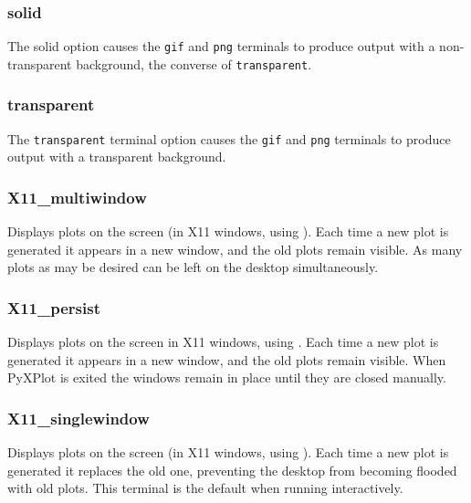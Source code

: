 \subsubsection{solid}

The solid option causes the {\tt gif} and {\tt png} terminals to produce output
with a non-transparent background, the converse of {\tt transparent}.


\subsubsection{transparent}

The {\tt transparent} terminal option causes the {\tt gif} and {\tt png}
terminals to produce output with a transparent background.


\subsubsection{X11\_multiwindow}

Displays plots on the screen (in X11 windows, using \ghostview). Each time a new
plot is generated it appears in a new window, and the old plots remain visible.
As many plots as may be desired can be left on the desktop simultaneously.

\subsubsection{X11\_persist}

Displays plots on the screen in X11 windows, using \ghostview.  Each time a new
plot is generated it appears in a new window, and the old plots remain visible.
When PyXPlot is exited the windows remain in place until they are closed
manually.

\subsubsection{X11\_singlewindow}

Displays plots on the screen (in X11 windows, using \ghostview). Each time a new
plot is generated it replaces the old one, preventing the desktop from becoming
flooded with old plots. This terminal is the default when running
interactively.


